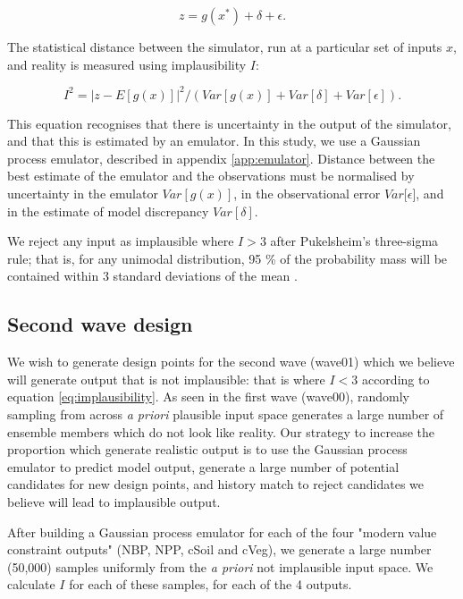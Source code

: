 \documentclass[gmd, manuscript]{copernicus}
\begin{document}
\begin{equation}
z = g(x^*) + \delta + \epsilon. 
\end{equation}

The statistical distance between the simulator, run at a particular set of inputs $x$, and reality is measured using implausibility $I$:

\begin{equation}\label{eq:implausibility}
I^{2} = {\lvert  z - E[g(x)]\rvert}^{2} /  (Var[g(x)] + Var[\delta] +  Var[\epsilon]).
\end{equation}

This equation recognises that there is uncertainty in the output of the simulator, and that this is estimated by an emulator. In this study, we use a Gaussian process emulator, described in appendix \ref{app:emulator}. Distance between the best estimate of the emulator and the observations must be normalised by uncertainty in the emulator $Var[g(x)]$, in the observational error $Var[\epsilon$], and in the estimate of model discrepancy $Var[\delta]$. 

We reject any input as implausible where $I >3$ after Pukelsheim's three-sigma rule; that is, for any unimodal distribution, 95 \% of the probability mass will be contained within 3 standard deviations of the mean \citep{pukelsheim1994three}.

\subsection{Second wave design}\label{ssec:second_wave_design}

We wish to generate design points for the second wave (wave01) which we believe will generate output that is not implausible: that is where $I<3$ according to equation \ref{eq:implausibility}. As seen in the first wave (wave00), randomly sampling from across \emph{a priori} plausible input space generates a large number of ensemble members which do not look like reality. Our strategy to increase the proportion which generate realistic output is to use the Gaussian process emulator to predict model output, generate a large number of potential candidates for new design points, and history match to reject candidates we believe will lead to implausible output.

After building a Gaussian process emulator for each of the four "modern value constraint outputs" (NBP, NPP, cSoil and cVeg), we generate a large number (50,000) samples uniformly from the \emph{a priori} not implausible input space. We calculate $I$ for each of these samples, for each of the 4 outputs. 
\end{document}
